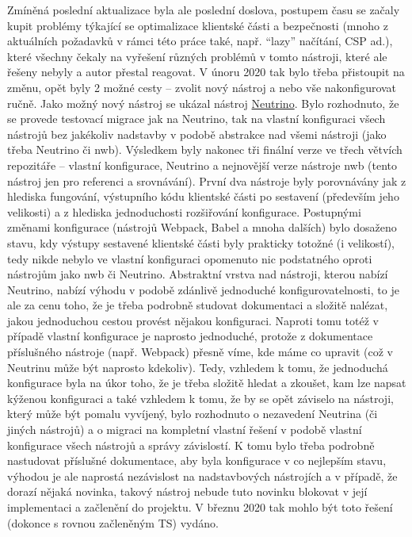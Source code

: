 Zmíněná poslední aktualizace byla ale poslední doslova, postupem času se začaly kupit problémy týkající se optimalizace klientské části a bezpečnosti (mnoho z aktuálních požadavků v rámci této práce také, např. \enquote{lazy} načítání, CSP ad.), které všechny čekaly na vyřešení různých problémů v tomto nástroji, které ale řešeny nebyly a autor přestal reagovat. V únoru 2020 tak bylo třeba přistoupit na změnu, opět byly 2 možné cesty -- zvolit nový nástroj a nebo vše nakonfigurovat ručně. Jako možný nový nástroj se ukázal nástroj \href{https://github.com/neutrinojs/neutrino/}{Neutrino}. Bylo rozhodnuto, že se provede testovací migrace jak na Neutrino, tak na vlastní konfiguraci všech nástrojů bez jakékoliv nadstavby v podobě abstrakce nad všemi nástroji (jako třeba Neutrino či nwb). Výsledkem byly nakonec tři finální verze ve třech větvích repozitáře -- vlastní konfigurace, Neutrino a nejnovější verze nástroje nwb (tento nástroj jen pro referenci a srovnávání). První dva nástroje byly porovnávány jak z hlediska fungování, výstupního kódu klientské části po sestavení (především jeho velikosti) a z hlediska jednoduchosti rozšiřování konfigurace. Postupnými změnami konfigurace (nástrojů Webpack, Babel a mnoha dalších) bylo dosaženo stavu, kdy výstupy sestavené klientské části byly prakticky totožné (i velikostí), tedy nikde nebylo ve vlastní konfiguraci opomenuto nic podstatného oproti nástrojům jako nwb či Neutrino. Abstraktní vrstva nad nástroji, kterou nabízí Neutrino, nabízí výhodu v podobě zdánlivě jednoduché konfigurovatelnosti, to je ale za cenu toho, že je třeba podrobně studovat dokumentaci a složitě nalézat, jakou jednoduchou cestou provést nějakou konfiguraci. Naproti tomu totéž v případě vlastní konfigurace je naprosto jednoduché, protože z dokumentace příslušného nástroje (např. Webpack) přesně víme, kde máme co upravit (což v Neutrinu může být naprosto kdekoliv). Tedy, vzhledem k tomu, že jednoduchá konfigurace byla na úkor toho, že je třeba složitě hledat a zkoušet, kam lze napsat kýženou konfiguraci a také vzhledem k tomu, že by se opět záviselo na nástroji, který může být pomalu vyvíjený, bylo rozhodnuto o nezavedení Neutrina (či jiných nástrojů) a o migraci na kompletní vlastní řešení v podobě vlastní konfigurace všech nástrojů a správy závislostí. K tomu bylo třeba podrobně nastudovat příslušné dokumentace, aby byla konfigurace v co nejlepším stavu, výhodou je ale naprostá nezávislost na nadstavbových nástrojích a v případě, že dorazí nějaká novinka, takový nástroj nebude tuto novinku blokovat v její implementaci a začlenění do projektu. V březnu 2020 tak mohlo být toto řešení (dokonce s rovnou začleněným TS) vydáno.

